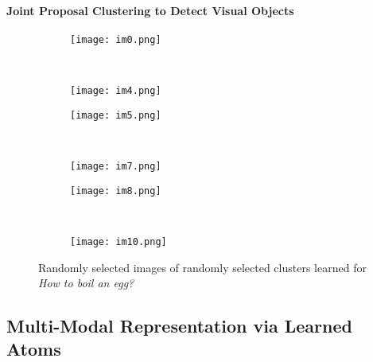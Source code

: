 \paragraph{Joint Proposal Clustering to Detect Visual Objects}
\begin{figure}[ht]
  \begin{subfigure}[b]{0.23\textwidth}
\texttt{[image: im0.png]}
\end{subfigure}
~
\begin{subfigure}[b]{0.23\textwidth}
\texttt{[image: im4.png]}
\end{subfigure}
\begin{subfigure}[b]{0.23\textwidth}
\texttt{[image: im5.png]}
\end{subfigure}
~
\begin{subfigure}[b]{0.23\textwidth}
\texttt{[image: im7.png]}
\end{subfigure}

\begin{subfigure}[b]{0.23\textwidth}
\texttt{[image: im8.png]}
\end{subfigure}
~
\begin{subfigure}[b]{0.23\textwidth}
\texttt{[image: im10.png]}
\end{subfigure}
\caption{Randomly selected images of randomly selected clusters learned for \emph{How to boil an egg?}}
\end{figure}
\subsection{Multi-Modal Representation via Learned Atoms}
